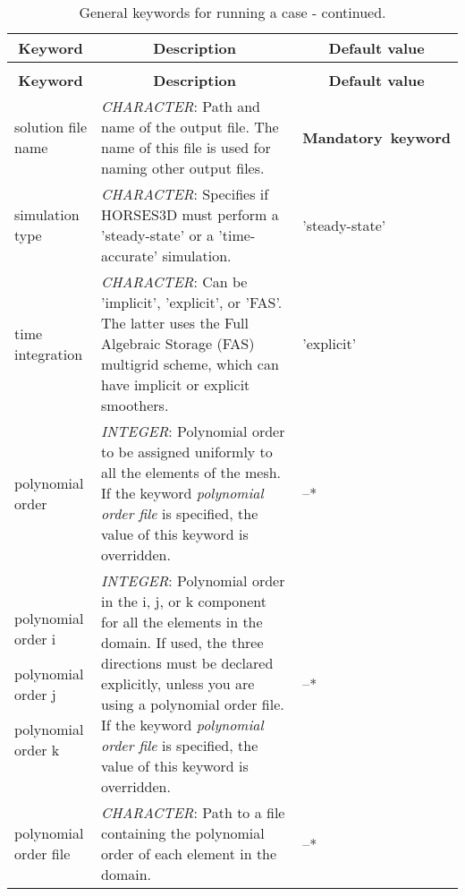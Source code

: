 \documentclass[a4paper,10pt]{report}
\begin{document}
\begin{longtable}{|p{4cm}|p{10cm}|p{2.2cm}|}
\caption{General keywords for running a case.} \label{tab:runningkey} \\
\hline
\multicolumn{1}{|c|}{\textbf{Keyword}} & \multicolumn{1}{c|}{\textbf{Description}} & \multicolumn{1}{c|}{\textbf{Default value}} \\ \hline
\endfirsthead

\caption{General keywords for running a case - continued.} \\
\hline
\multicolumn{1}{|c|}{\textbf{Keyword}} & \multicolumn{1}{c|}{\textbf{Description}} & \multicolumn{1}{c|}{\textbf{Default value}} \\ \hline
\endhead

solution file name   & \textit{CHARACTER}: Path and name of the output file. The name of this file is used for naming other output files. & \textbf{Mandatory\ keyword} \\ \hline

simulation type        & \textit{CHARACTER}: Specifies if HORSES3D must perform a 'steady-state' or a 'time-accurate' simulation. &  'steady-state'\\ \hline

time integration & \textit{CHARACTER}: Can be 'implicit', 'explicit', or 'FAS'. The latter uses the Full Algebraic Storage (FAS) multigrid scheme, which can have implicit or explicit smoothers. & 'explicit' \\ \hline

polynomial order   & \textit{INTEGER}: Polynomial order to be assigned uniformly to all the elements of the mesh. If the keyword \textit{polynomial order file} is specified, the value of this keyword is overridden. & --* \\ \hline

polynomial order i \

polynomial order j \

polynomial order k & \textit{INTEGER}: Polynomial order in the i, j, or k component for all the elements in the domain. If used, the three directions must be declared explicitly, unless you are using a polynomial order file. If the keyword \textit{polynomial order file} is specified, the value of this keyword is overridden. & --* \\ \hline

polynomial order file  & \textit{CHARACTER}: Path to a file containing the polynomial order of each element in the domain. & --* \\ \hline


\end{longtable}
\end{document}
